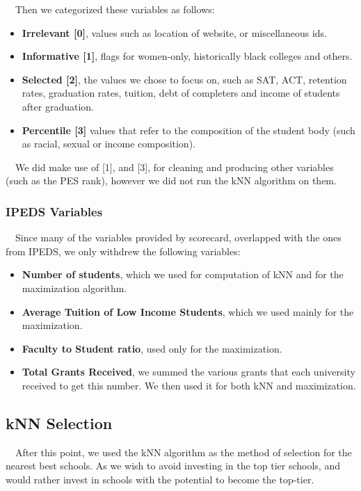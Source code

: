 \documentclass[12pt]{scrartcl}
\begin{document}
			\ \ Then we categorized these variables as follows:
			\begin{itemize}
				\item \textbf{Irrelevant [0]}, values such as location of website, or miscellaneous ids.
				\item \textbf{Informative [1]}, flags for women-only, historically black colleges and others. 
				\item \textbf{Selected [2]}, the values we chose to focus on, such as SAT, ACT, retention rates, graduation rates, tuition, debt of completers and income of students after graduation. 
				\item \textbf{Percentile [3]} values that refer to the composition of the student body (such as racial, sexual or income composition).
			\end{itemize}
			\ \ We did make use of [1], and [3], for cleaning and producing other variables (such as the PES rank), however we did not run the kNN algorithm on them.

		\subsubsection{IPEDS Variables}
			\ \ Since many of the variables provided by scorecard, overlapped with the ones from IPEDS, we only withdrew the following variables:
			\begin{itemize}
				\item \textbf{Number of students}, which we used for computation of kNN and for the maximization algorithm.
				\item \textbf{Average Tuition of Low Income Students}, which we used mainly for the maximization.
				\item \textbf{Faculty to Student ratio}, used only for the maximization.
				\item \textbf{Total Grants Received}, we summed the various grants that each university received to get this number. We then used it for both kNN and maximization.
			\end{itemize}
	
	\subsection{kNN Selection}
		\ \ After this point, we used the kNN algorithm as the method of selection for the nearest best schools. As we wish to avoid investing in the top tier schools, and would rather invest in schools with the potential to become the top-tier. \\
\end{document}
